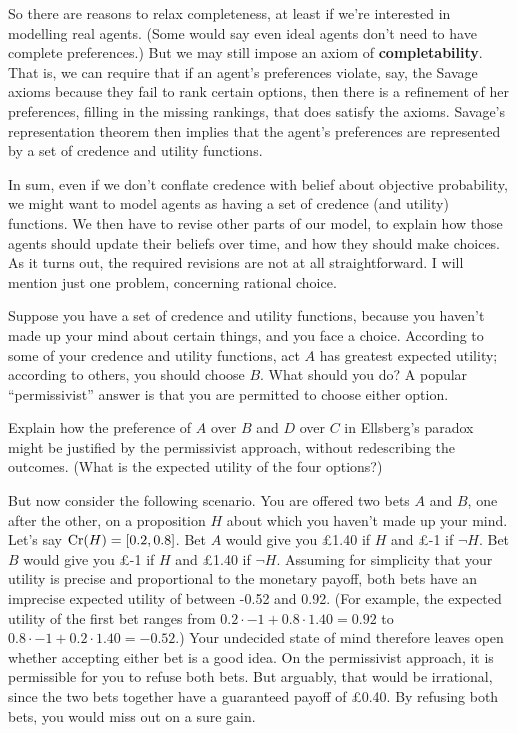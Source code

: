 

So there are reasons to relax completeness, at least if we're
interested in modelling real agents. (Some would say even ideal
agents don't need to have complete preferences.) But we may still
impose an axiom of \textbf{completability}. That is, we can require
that if an agent's preferences violate, say, the Savage axioms because
they fail to rank certain options, then there is a refinement of her
preferences, filling in the missing rankings, that does satisfy the
axioms. Savage's representation theorem then implies that the agent's
preferences are represented by a set of credence and utility
functions.

In sum, even if we don't conflate credence with belief about objective
probability, we might want to model agents as having a set of credence
(and utility) functions. We then have to revise other parts of our
model, to explain how those agents should update their beliefs over
time, and how they should make choices. As it turns out, the required
revisions are not at all straightforward. I will mention just one
problem, concerning rational choice. 

Suppose you have a set of credence and utility functions, because you
haven't made up your mind about certain things, and you face a
choice. According to some of your credence and utility functions, act
$A$ has greatest expected utility; according to others, you should
choose $B$. What should you do? A popular ``permissivist'' answer is
that you are permitted to choose either option.

\begin{exercise2}
  Explain how the preference of $A$ over $B$ and $D$ over $C$ in
  Ellsberg's paradox might be justified by the permissivist approach,
  without redescribing the outcomes. (What is the expected utility of
  the four options?) 
\end{exercise2}

But now consider the following scenario. You are offered two bets $A$
and $B$, one after the other, on a proposition $H$ about which you
haven't made up your mind. Let's say $\text{Cr}(H) = [0.2,0.8]$. Bet $A$
would give you £1.40 if $H$ and £-1 if $\neg H$. Bet $B$ would give
you £-1 if $H$ and £1.40 if $\neg H$. Assuming for simplicity that
your utility is precise and proportional to the monetary payoff, both
bets have an imprecise expected utility of between -0.52 and
0.92. (For example, the expected utility of the first bet ranges from
$0.2 \cdot -1 + 0.8 \cdot 1.40 = 0.92$ to $0.8 \cdot -1 + 0.2 \cdot
1.40 = -0.52$.) Your undecided state of mind therefore leaves open
whether accepting either bet is a good idea. On the permissivist
approach, it is permissible for you to refuse both bets. But
arguably, that would be irrational, since the two bets together have a
guaranteed payoff of £0.40. By refusing both bets, you would miss out
on a sure gain.


